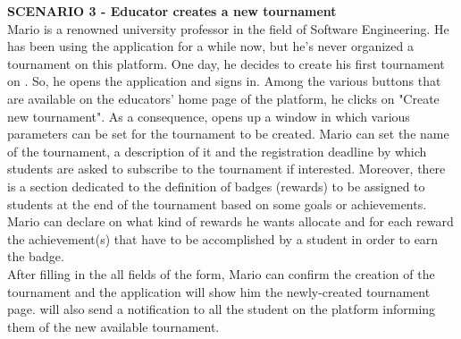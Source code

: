     \textbf{SCENARIO 3 - Educator creates a new tournament}\\
    Mario is a renowned university professor in the field of Software Engineering. He has been using the \app application for a while now, but he's never organized a tournament on this platform.
    One day, he decides to create his first tournament on \app. So, he opens the application and signs in. Among the various buttons that are available on the educators' home page of the platform, he clicks on "Create new tournament". As a consequence, \app opens up a window in which various parameters can be set for the tournament to be created. Mario can set the name of the tournament, a description of it and the registration deadline by which students are asked to subscribe to the tournament if interested. Moreover, there is a section dedicated to the definition of badges (rewards) to be assigned to students at the end of the tournament based on some goals or achievements. Mario can declare on \app what kind of rewards he wants allocate and for each reward the achievement(s) that have to be accomplished by a student in order to earn the badge.\\
    After filling in the all fields of the form, Mario can confirm the creation of the tournament and the application will show him the newly-created tournament page.
    \app will also send a notification to all the student on the platform informing them of the new available tournament.\\

